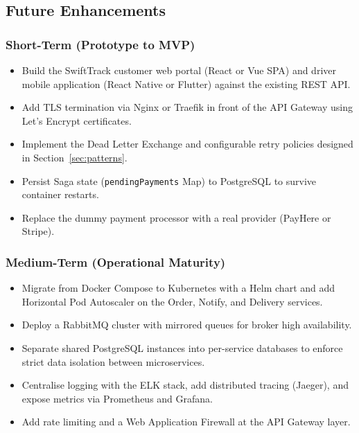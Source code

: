 \subsection{Future Enhancements}
\label{subsec:future_work}

\subsubsection{Short-Term (Prototype to MVP)}
\begin{itemize}
  \item Build the SwiftTrack customer web portal (React or Vue SPA) and driver
        mobile application (React Native or Flutter) against the existing REST API.
  \item Add TLS termination via Nginx or Traefik in front of the API Gateway
        using Let's Encrypt certificates.
  \item Implement the Dead Letter Exchange and configurable retry policies
        designed in Section~\ref{sec:patterns}.
  \item Persist Saga state (\texttt{pendingPayments} Map) to PostgreSQL to
        survive container restarts.
  \item Replace the dummy payment processor with a real provider (PayHere or Stripe).
\end{itemize}

\subsubsection{Medium-Term (Operational Maturity)}
\begin{itemize}
  \item Migrate from Docker Compose to Kubernetes with a Helm chart and add
        Horizontal Pod Autoscaler on the Order, Notify, and Delivery services.
  \item Deploy a RabbitMQ cluster with mirrored queues for broker high availability.
  \item Separate shared PostgreSQL instances into per-service databases to enforce
        strict data isolation between microservices.
  \item Centralise logging with the ELK stack, add distributed tracing (Jaeger),
        and expose metrics via Prometheus and Grafana.
  \item Add rate limiting and a Web Application Firewall at the API Gateway layer.
\end{itemize}


